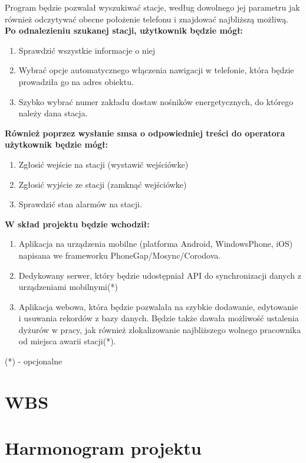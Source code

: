 \documentclass[12pt]{article}
\begin{document}
Program będzie pozwalał wyszukiwać stacje, według dowolnego jej parametru jak również odczytywać obecne położenie telefonu i znajdować najbliższą możliwą.\\
\textbf{Po odnalezieniu szukanej stacji, użytkownik będzie mógł:}
\begin{enumerate}
\item Sprawdzić wszystkie informacje o niej
\item Wybrać opcje automatycznego włączenia nawigacji w telefonie, która będzie prowadziła go na adres obiektu.
\item Szybko wybrać numer zakładu dostaw nośników energetycznych, do którego należy dana stacja.
\end{enumerate}
\textbf{Również poprzez wysłanie smsa o odpowiedniej treści do operatora użytkownik będzie mógł:}
\begin{enumerate}
\item Zgłosić wejście na stacji (wystawić wejściówke)
\item Zgłosić wyjście ze stacji (zamknąć wejściówke)
\item Sprawdzić stan alarmów na stacji.
\end{enumerate}

\textbf{W skład projektu będzie wchodził:}
\begin{enumerate}
\item Aplikacja na urządzenia mobilne (platforma Android, WindowsPhone, iOS) napisana we frameworku PhoneGap/Mosync/Corodova.
\item Dedykowany serwer, który będzie udostępniał API do synchronizacji danych z urządzeniami mobilnymi(*)
\item Aplikacja webowa, która będzie pozwalała na szybkie dodawanie, edytowanie i usuwania rekordów z bazy danych. Będzie także dawała możliwość ustalenia dyżurów w pracy, jak również zlokalizowanie najbliższego wolnego pracownika od miejsca awarii stacji(*).
\end{enumerate}
(*) - opcjonalne
\section{WBS}
\section{Harmonogram projektu}
\begin{figure}[h]
\end{figure}
\end{document}
